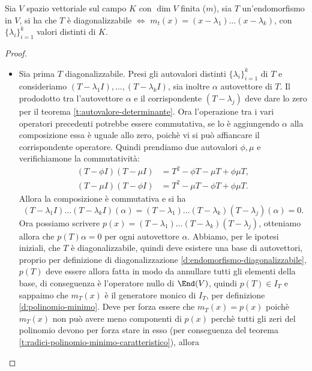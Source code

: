 \begin{teorema}
	Sia $V$ spazio vettoriale sul campo $K$ con $\dim V$ finita ($m$), sia $T$ un'endomorfismo in $V$, si ha che $T$ è diagonalizzabile $\iff$ $m_t(x) = (x-\lambda_1)\dots(x-\lambda_k)$, con $\{\lambda_i\}_{i=1}^k$ valori distinti di $K$.
\end{teorema}
\begin{proof}
	\begin{itemize}
		\item Sia prima $T$ diagonalizzabile.
			Presi gli autovalori distinti $\{\lambda_i\}_{i=1}^k$ di $T$ e consideriamo $(T-\lambda_1 I),\dots,(T-\lambda_k I)$, sia inoltre $\alpha$ autovettore di $T$.
			Il prododotto tra l'autovettore $\alpha$ e il corrispondente $(T-\lambda_j)$ deve dare lo zero per il teorema \ref{t:autovalore-determinante}.
			Ora l'operazione tra i vari operatori precedenti potrebbe essere commutativa, se lo è aggiungendo $\alpha$ alla composizione essa è uguale allo zero, poichè vi si può affiancare il corrispondente operatore.
			Quindi prendiamo due autovalori $\phi, \mu$ e verifichiamone la commutatività:
			\begin{align*}
				(T - \phi I)(T- \mu I) &= T^2 - \phi T - \mu T + \phi \mu T,\\
				(T- \mu I)(T - \phi I) &= T^2 - \mu T -\phi T + \phi \mu T.
			\end{align*}
			Allora la composizione è commutativa e si ha
			\begin{equation*}
				(T-\lambda_1 I)\dots(T-\lambda_k I)(\alpha) = (T-\lambda_1)\dots(T-\lambda_k)(T-\lambda_j)(\alpha) = 0.
			\end{equation*}
			Ora possiamo scrivere $p(x) = (T-\lambda_1)\dots(T-\lambda_k)(T-\lambda_j)$, otteniamo allora che $p(T)\alpha = 0$ per ogni autovettore $\alpha$.
			Abbiamo, per le ipotesi iniziali, che $T$ è diagonalizzabile, quindi deve esistere una base di autovettori, proprio per definizione di diagonalizzazione \ref{d:endomorfismo-diagonalizzabile}, $p(T)$  deve essere allora fatta in modo da annullare tutti gli elementi della base, di conseguenza è l'operatore nullo di $\End(V)$, quindi $p(T)\in I_T$ e sappaimo che $m_T(x)$ è il generatore monico di $I_T$, per definizione \ref{d:polinomio-minimo}.
			Deve per forza essere che $m_T(x)=p(x)$ poichè $m_T(x)$ non può avere meno componenti di $p(x)$ perchè tutti gli zeri del polinomio devono per forza stare in esso (per conseguenza del teorema \ref{t:radici-polinomio-minimo-caratteristico}), allora
			\begin{equation*}

\end{equation*}
\end{itemize}
\end{proof}
